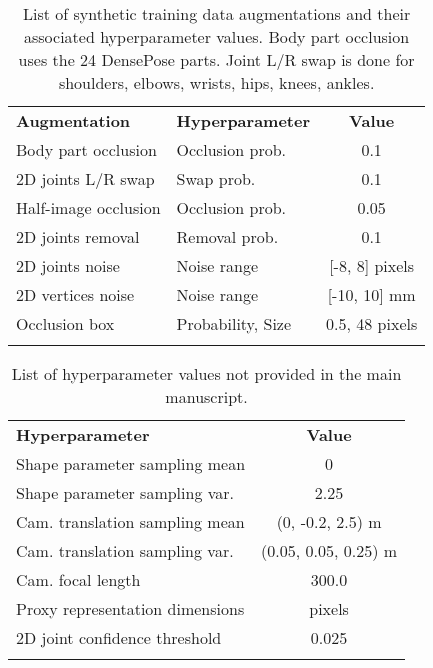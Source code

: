 \documentclass[final]{cvpr}
\begin{document}
\begin{table}[t]
\centering
\small
\begin{tabular}{l l c}
    \hline
    \noalign{\smallskip} 
    \textbf{Augmentation} & \textbf{Hyperparameter} & \textbf{Value}\\
    \noalign{\smallskip}
    \hline
    \noalign{\smallskip}
    Body part occlusion & Occlusion prob. & 0.1 \\
    2D joints L/R swap & Swap prob. & 0.1\\
    Half-image occlusion & Occlusion prob. & 0.05\\
    2D joints removal & Removal prob. & 0.1\\
    2D joints noise & Noise range & [-8, 8] pixels\\
    2D vertices noise & Noise range & [-10, 10] mm \\
    Occlusion box & Probability, Size & 0.5, 48 pixels \\
    \noalign{\smallskip}
    \hline
    \noalign{\smallskip}
    \noalign{\smallskip}
    \end{tabular}
\caption{List of synthetic training data augmentations and their associated hyperparameter values. Body part occlusion uses the 24 DensePose \cite{Guler2018DensePose} parts. Joint L/R swap is done for shoulders, elbows, wrists, hips, knees, ankles.}
\label{table:sup_mat_augment_hypparams}
\end{table}

\begin{table}[t]
\centering
\small
\begin{tabular}{l c}
    \hline
    \noalign{\smallskip} 
    \textbf{Hyperparameter} & \textbf{Value}\\
    \noalign{\smallskip}
    \hline
    \noalign{\smallskip}
    Shape parameter sampling mean & 0 \\
    Shape parameter sampling var. & 2.25 \\
    Cam. translation sampling mean & (0, -0.2, 2.5) m\\
    Cam. translation sampling var. & (0.05, 0.05, 0.25) m\\
    Cam. focal length & 300.0\\
    Proxy representation dimensions &  pixels\\
    2D joint confidence threshold & 0.025\\
    \noalign{\smallskip}
    \hline
    \noalign{\smallskip}
    \noalign{\smallskip}
    \end{tabular}
\caption{List of hyperparameter values not provided in the main manuscript.}
\label{table:sup_mat_hypparams}
\end{table}
\end{document}

